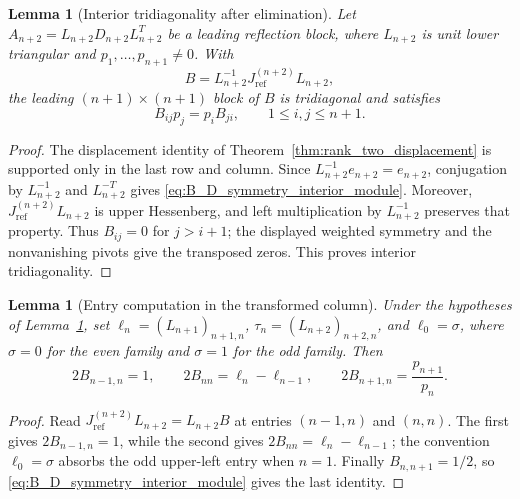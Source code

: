 \documentclass[preprint,12pt]{elsarticle}
\numberwithin{equation}{section}
\theoremstyle{plain}
\newtheorem{lemma}[theorem]{Lemma}
\theoremstyle{definition}
\theoremstyle{remark}
\begin{document}
\begin{lemma}[Interior tridiagonality after elimination]
\label{lem:interior_tridiagonality_B}
Let \(A_{n+2}=L_{n+2}D_{n+2}L_{n+2}^T\) be a leading reflection block, where
\(L_{n+2}\) is unit lower triangular and \(p_1,\ldots,p_{n+1}\ne0\).  With
\[
B=L_{n+2}^{-1}J_{\mathrm{ref}}^{(n+2)}L_{n+2},
\]
the leading \((n+1)\times(n+1)\) block of \(B\) is tridiagonal and satisfies
\begin{equation}
B_{ij}p_j=p_iB_{ji},
\qquad 1\le i,j\le n+1.
\label{eq:B_D_symmetry_interior_module}
\end{equation}
\end{lemma}

\begin{proof}
The displacement identity of Theorem~\ref{thm:rank_two_displacement} is supported only in
the last row and column.  Since \(L_{n+2}^{-1}e_{n+2}=e_{n+2}\), conjugation by
\(L_{n+2}^{-1}\) and \(L_{n+2}^{-T}\) gives
\eqref{eq:B_D_symmetry_interior_module}.  Moreover,
\(J_{\mathrm{ref}}^{(n+2)}L_{n+2}\) is upper Hessenberg, and left multiplication by
\(L_{n+2}^{-1}\) preserves that property.  Thus \(B_{ij}=0\) for \(j>i+1\); the displayed
weighted symmetry and the nonvanishing pivots give the transposed zeros.  This proves
interior tridiagonality.
\end{proof}

\begin{lemma}[Entry computation in the transformed column]
\label{lem:entry_computation_column_n}
Under the hypotheses of Lemma~\ref{lem:interior_tridiagonality_B}, set
\(\ell_n=(L_{n+1})_{n+1,n}\), \(\tau_n=(L_{n+2})_{n+2,n}\), and
\(\ell_0=\sigma\), where \(\sigma=0\) for the even family and \(\sigma=1\) for the odd
family.  Then
\begin{equation}
2B_{n-1,n}=1,
\qquad
2B_{nn}=\ell_n-\ell_{n-1},
\qquad
2B_{n+1,n}=\frac{p_{n+1}}{p_n}.
\label{eq:B_three_entries_module}
\end{equation}
\end{lemma}

\begin{proof}
Read \(J_{\mathrm{ref}}^{(n+2)}L_{n+2}=L_{n+2}B\) at entries \((n-1,n)\) and
\((n,n)\).  The first gives \(2B_{n-1,n}=1\), while the second gives
\(2B_{nn}=\ell_n-\ell_{n-1}\); the convention \(\ell_0=\sigma\) absorbs the odd
upper-left entry when \(n=1\).  Finally \(B_{n,n+1}=1/2\), so
\eqref{eq:B_D_symmetry_interior_module} gives the last identity.
\end{proof}
\end{document}
